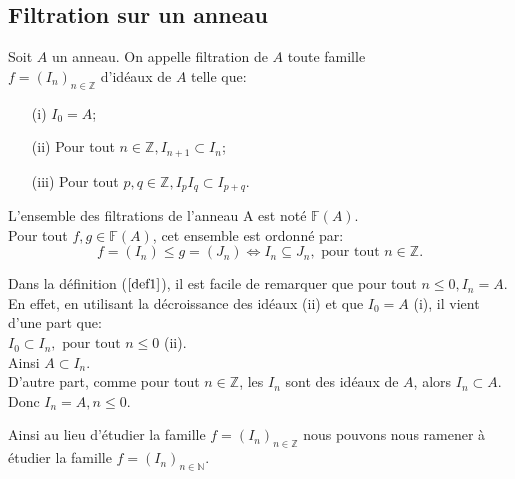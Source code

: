 \subsection{Filtration sur un anneau}
\begin{madefinition}
	\label{def1}
	Soit $A$ un anneau. On appelle filtration de $A$ toute famille\\ $f = (I_n)_{n \in \mathbb{Z}}$ d'idéaux de $A$ telle que:
	\begin{enumerate}
		\item[(i)] $I_0 = A$;
		\item[(ii)] Pour tout $n \in \mathbb{Z}, I_{n+1} \subset I_n$;
		\item[(iii)] Pour tout $p,q \in \mathbb{Z}, I_pI_q \subset I_{p+q}$.
	\end{enumerate}
	L'ensemble des filtrations de l'anneau A est noté $\mathbb{F}(A)$.\\
	Pour tout $f,g \in \mathbb{F}(A)$, cet ensemble est ordonné par:
	\[f = (I_n) \leqslant g = (J_n) \Longleftrightarrow  I_n \subseteq J_n , \text{ pour tout } n \in \mathbb{Z}.\]
\end{madefinition}
\begin{maremarque}
	Dans la définition ($\ref{def1}$), il est facile de remarquer que pour tout $n\leq 0, I_n = A$.\\ En effet, en utilisant la décroissance des idéaux (ii) et que $I_0 = A$ (i), il vient d'une part que: \\ $I_0 \subset I_n , \text{ pour tout } n \leq 0$ (ii). \\ Ainsi $A \subset I_n$.\\
	D'autre part, comme pour tout $ n \in \mathbb{Z}$, les $I_n$ sont des idéaux de $A$, alors $I_n \subset A$.\\
	Donc $I_n = A, n \leq 0$.
\end{maremarque}
Ainsi au lieu d'étudier la famille $f = (I_n)_{n \in \mathbb{Z}}$ nous pouvons nous ramener à étudier la famille $f = (I_n)_{n \in \mathbb{N}}$.

